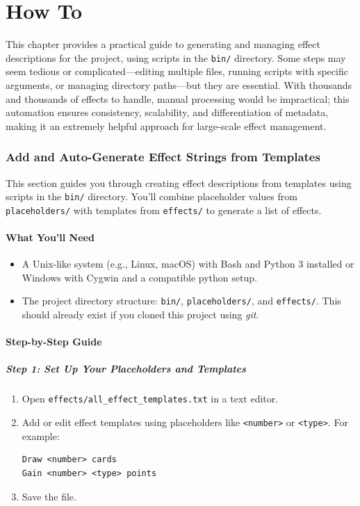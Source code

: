 \chapter{How To}

This chapter provides a practical guide to generating and managing effect descriptions for the project, using scripts in the \texttt{bin/} directory. Some steps may seem tedious or complicated—editing multiple files, running scripts with specific arguments, or managing directory paths—but they are essential. With thousands and thousands of effects to handle, manual processing would be impractical; this automation ensures consistency, scalability, and differentiation of metadata, making it an extremely helpful approach for large-scale effect management.



\subsection{Add and Auto-Generate Effect Strings from Templates}

This section guides you through creating effect descriptions from templates using scripts in the \texttt{bin/} directory. You’ll combine placeholder values from \texttt{placeholders/} with templates from \texttt{effects/} to generate a list of effects.

\subsubsection{What You’ll Need}
\begin{itemize}
	\item A Unix-like system (e.g., Linux, macOS) with Bash and Python 3 installed or Windows with Cygwin and a compatible python setup.
	\item The project directory structure: \texttt{bin/}, \texttt{placeholders/}, and \texttt{effects/}. This should already exist if you cloned this project using \textit{git}.
\end{itemize}

\subsubsection{Step-by-Step Guide}

\paragraph{Step 1: Set Up Your Placeholders and Templates}
\begin{enumerate}
	\item Open \texttt{effects/all\_effect\_templates.txt} in a text editor.
	\item Add or edit effect templates using placeholders like \texttt{<number>} or \texttt{<type>}. For example:
\begin{lstlisting}
Draw <number> cards
Gain <number> <type> points
\end{lstlisting}
	\item Save the file.
\end{enumerate}

